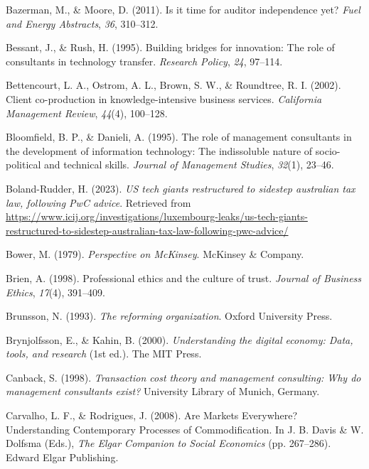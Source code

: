 \documentclass[
  man,floatsintext]{apa6}
\newlength{\cslhangindent}
\newenvironment{CSLReferences}[2] %
 {\begin{list}{}{%
  \setlength{\itemindent}{0pt}
  \setlength{\leftmargin}{0pt}
  \setlength{\parsep}{0pt}
  \ifodd #1
   \setlength{\leftmargin}{\cslhangindent}
   \setlength{\itemindent}{-1\cslhangindent}
  \fi
  \setlength{\itemsep}{#2\baselineskip}}}
 {\end{list}}
\begin{document}
\begin{CSLReferences}{1}{0}
Bazerman, M., \& Moore, D. (2011). Is it time for auditor independence yet? \emph{Fuel and Energy Abstracts}, \emph{36}, 310--312.

Bessant, J., \& Rush, H. (1995). Building bridges for innovation: The role of consultants in technology transfer. \emph{Research Policy}, \emph{24}, 97--114.

Bettencourt, L. A., Ostrom, A. L., Brown, S. W., \& Roundtree, R. I. (2002). Client co-production in knowledge-intensive business services. \emph{California Management Review}, \emph{44}(4), 100--128.

Bloomfield, B. P., \& Danieli, A. (1995). The role of management consultants in the development of information technology: The indissoluble nature of socio-political and technical skills. \emph{Journal of Management Studies}, \emph{32}(1), 23--46.

Boland-Rudder, H. (2023). \emph{US tech giants restructured to sidestep australian tax law, following PwC advice}. Retrieved from \url{https://www.icij.org/investigations/luxembourg-leaks/us-tech-giants-restructured-to-sidestep-australian-tax-law-following-pwc-advice/}

Bower, M. (1979). \emph{Perspective on McKinsey}. McKinsey \& Company.

Brien, A. (1998). Professional ethics and the culture of trust. \emph{Journal of Business Ethics}, \emph{17}(4), 391--409.

Brunsson, N. (1993). \emph{The reforming organization}. Oxford University Press.

Brynjolfsson, E., \& Kahin, B. (2000). \emph{Understanding the digital economy: Data, tools, and research} (1st ed.). The MIT Press.

Canback, S. (1998). \emph{Transaction cost theory and management consulting: Why do management consultants exist?} University Library of Munich, Germany.

Carvalho, L. F., \& Rodrigues, J. (2008). {Are Markets Everywhere? Understanding Contemporary Processes of Commodification}. In J. B. Davis \& W. Dolfsma (Eds.), \emph{{The Elgar Companion to Social Economics}} (pp. 267--286). Edward Elgar Publishing.


\end{CSLReferences}
\end{document}

